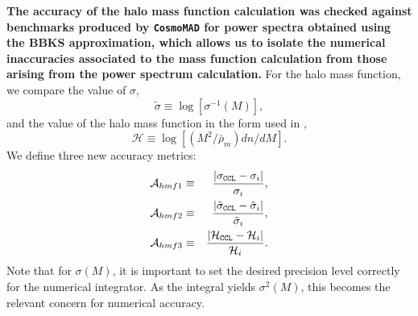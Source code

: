 \documentclass[\docopts]{\docclass}
\begin{document}
{\bf The accuracy of the halo mass function calculation was checked against benchmarks produced by {\tt CosmoMAD} for power spectra obtained using the BBKS approximation, which allows us to isolate the numerical inaccuracies associated to the mass function calculation from those arising from the power spectrum calculation.} For the halo mass function, we compare the value of $\sigma$,
\begin{equation}
  \tilde\sigma\equiv\log[\sigma^{-1}(M)],\label{eq:tildesig}
\end{equation}
and the value of the halo mass function in the form used in \citet{Tinker2008},
\begin{equation}
  \mathcal{H}\equiv \log[(M^2/\bar{\rho}_m)dn/dM].
  \label{eq:newhmf}
\end{equation}
We define three new accuracy metrics:
\begin{eqnarray}
  \mathcal{A}_{hmf1}&\equiv&\frac{|\sigma_{\tt CCL}-\sigma_i|}{\sigma_i},\\
  \mathcal{A}_{hmf2}&\equiv&\frac{|\tilde\sigma_{\tt CCL}-\tilde\sigma_i|}{\tilde\sigma_i},\\
  \mathcal{A}_{hmf3}&\equiv&\frac{|\mathcal{H}_{\tt CCL}-\mathcal{H}_i|}{\mathcal{H}_i}.
\end{eqnarray}
Note that for $\sigma(M)$, it is important to set the desired precision level correctly for the numerical integrator. As the integral yields $\sigma^2(M)$, this becomes the relevant concern for numerical accuracy. 
\end{document}
